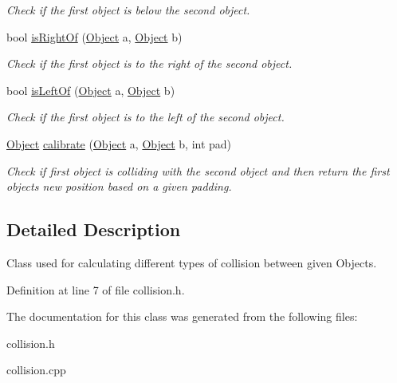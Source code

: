 \begin{DoxyCompactItemize}
\begin{DoxyCompactList}\small\item\em Check if the first object is below the second object. \end{DoxyCompactList}\item 
bool \hyperlink{classCollision_a9330290516beca87905e81a974ffca83}{is\+Right\+Of} (\hyperlink{classObject}{Object} a, \hyperlink{classObject}{Object} b)\hypertarget{classCollision_a9330290516beca87905e81a974ffca83}{}\label{classCollision_a9330290516beca87905e81a974ffca83}

\begin{DoxyCompactList}\small\item\em Check if the first object is to the right of the second object. \end{DoxyCompactList}\item 
bool \hyperlink{classCollision_aea67f8b0cd9b37408e2f6f65006b27d3}{is\+Left\+Of} (\hyperlink{classObject}{Object} a, \hyperlink{classObject}{Object} b)\hypertarget{classCollision_aea67f8b0cd9b37408e2f6f65006b27d3}{}\label{classCollision_aea67f8b0cd9b37408e2f6f65006b27d3}

\begin{DoxyCompactList}\small\item\em Check if the first object is to the left of the second object. \end{DoxyCompactList}\item 
\hyperlink{classObject}{Object} \hyperlink{classCollision_abf26c550eaf9a5351db56452c352b791}{calibrate} (\hyperlink{classObject}{Object} a, \hyperlink{classObject}{Object} b, int pad)\hypertarget{classCollision_abf26c550eaf9a5351db56452c352b791}{}\label{classCollision_abf26c550eaf9a5351db56452c352b791}

\begin{DoxyCompactList}\small\item\em Check if first object is colliding with the second object and then return the first objects new position based on a given padding. \end{DoxyCompactList}\end{DoxyCompactItemize}


\subsection{Detailed Description}
Class used for calculating different types of collision between given Objects. 

Definition at line 7 of file collision.\+h.



The documentation for this class was generated from the following files\+:\begin{DoxyCompactItemize}
\item 
collision.\+h\item 
collision.\+cpp\end{DoxyCompactItemize}
